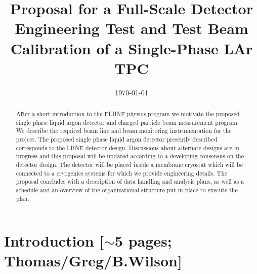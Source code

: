 \documentclass[12pt]{article}
\begin{document}
\linenumbers

\title{  Proposal for a Full-Scale Detector Engineering Test and Test Beam Calibration of a Single-Phase LAr TPC}

\date{\today}
	

\maketitle




\begin{abstract}

After a short introduction to the ELBNF physics program we motivate the proposed single phase liquid argon detector and charged particle beam measurement program. 
We describe the required beam line and beam monitoring instrumentation for the project.
The proposed single phase liquid argon detector presently described corresponds to the LBNE detector design. Discussions about alternate designs are in progress and this proposal will be updated according to a developing consensus on the detector design. The detector will be placed inside a membrane cryostat which will be connected to a cryogenics systems for which we provide engineering details. The proposal concludes with a description of data handling and analysis plans, as well as a schedule and an overview of the organizational structure put in place to execute the plan.

\end{abstract}

\newpage
\tableofcontents

\newpage

\section{Introduction [$\sim$5 pages; {\color{red} Thomas/Greg/B.Wilson}]}
	
%	

\end{document}
